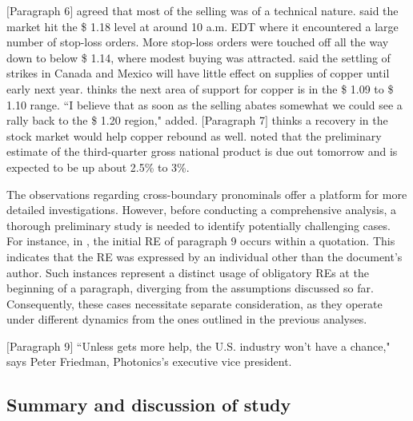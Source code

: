 \begin{exe}
	\ex\label{ex:raptopoulos} 
	\begin{xlist}
		\ex $[$Paragraph 6$]$  agreed that most of the selling was of a technical nature.  said the market hit the \$ 1.18 level at around 10 a.m. EDT where it encountered a large number of stop-loss orders. More stop-loss orders were touched off all the way down to below \$ 1.14, where modest buying was attracted.  said the settling of strikes in Canada and Mexico will have little effect on supplies of copper until early next year.  thinks the next area of support for copper is in the \$ 1.09 to \$ 1.10 range. ``I believe that as soon as the selling abates somewhat we could see a rally back to the \$ 1.20 region,"  added.
		\ex $[$Paragraph 7$]$  thinks a recovery in the stock market would help copper rebound as well.  noted that the preliminary estimate of the third-quarter gross national product is due out tomorrow and is expected
		to be up about 2.5\% to 3\%.
	\end{xlist}
\end{exe}


The observations regarding cross-boundary pronominals offer a platform for more detailed investigations. However, before conducting a comprehensive analysis, a thorough preliminary study is needed to identify potentially challenging cases. For instance, in , the initial RE of paragraph 9 occurs within a quotation. This indicates that the RE was expressed by an individual other than the document's author. Such instances represent a distinct usage of obligatory REs at the beginning of a paragraph, diverging from the assumptions discussed so far. Consequently, these cases necessitate separate consideration, as they operate under different dynamics from the ones outlined in the previous analyses.

\begin{exe}
	\ex\label{ex:insidequotation} \example{wsj-1474}
	\begin{xlist}
		\ex $[$Paragraph 9$]$ ``Unless  gets more help, the U.S. industry won't have a chance," says Peter Friedman, Photonics's executive vice president.
	\end{xlist}
\end{exe}


\subsection{Summary and discussion of study \studD}\label{subsec:studyDdiscussion}

